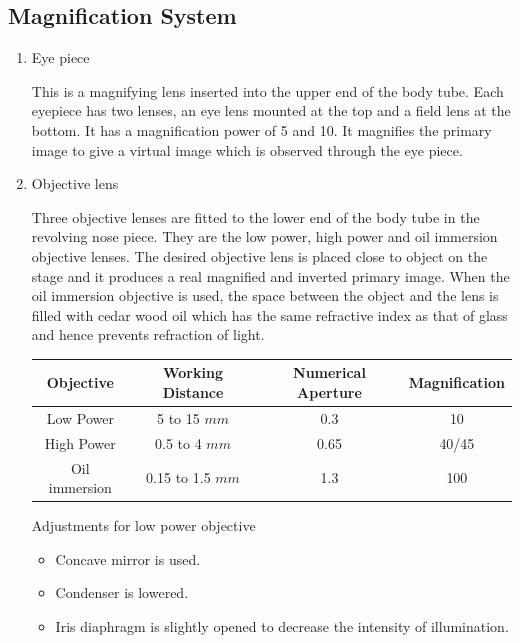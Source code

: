 \documentclass[a4paper,12pt,openany,oneside]{book}
\begin{document}
		\subsection*{Magnification System}
		\begin{enumerate}

			\item{Eye piece
				\par This is a magnifying lens inserted into the upper end of the body tube. Each eyepiece has two lenses, an eye lens mounted at the top and a field lens at the bottom. It has a magnification power of 5 and 10. It magnifies the primary image to give a virtual image which is observed through the eye piece.}
			\item{Objective lens

				\par Three objective lenses are fitted to the lower end of the body tube in the revolving nose piece. They are the low power, high power and oil immersion objective lenses. The desired objective lens is placed close to object on the stage and it produces a real magnified and inverted primary image. When the oil immersion objective is used, the space between the object and the lens is filled with cedar wood oil which has the same refractive index as that of glass and hence prevents refraction of light.\newline
				\begin{tabular}{c | c | c | c}
					\hline
					\textbf{Objective} & \textbf{Working Distance} & \textbf{Numerical Aperture} &\textbf{Magnification}\\
					\hline
					Low Power & 5 to 15 $mm$ & 0.3 & 10\\
					\hline
					High Power
					&0.5 to 4 $mm$
					&0.65
					&40/45 \\
					\hline

					Oil immersion
					&0.15 to 1.5 $mm$
					&1.3
					&100 \\

					\hline





				\end{tabular}

				\par
				Adjustments for low power objective
				\begin{itemize}
					\item {Concave mirror is used.}
					\item {Condenser is lowered.}
					\item {Iris diaphragm is slightly opened to decrease the intensity of illumination.}
				\end{itemize}

}
\end{enumerate}
\end{document}
